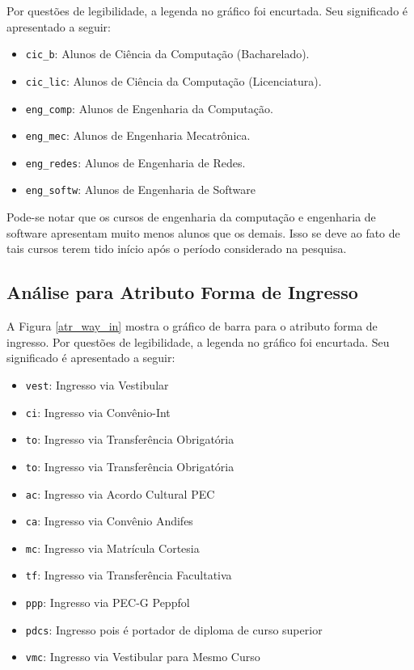 Por questões de legibilidade, a legenda no gráfico foi encurtada. Seu significado é
apresentado a seguir: 
\begin{itemize}
    \item \texttt{cic\_b}: Alunos de Ciência da Computação (Bacharelado).
    \item \texttt{cic\_lic}: Alunos de Ciência da Computação (Licenciatura).
    \item \texttt{eng\_comp}: Alunos de Engenharia da Computação.
    \item \texttt{eng\_mec}: Alunos de Engenharia Mecatrônica.
    \item \texttt{eng\_redes}: Alunos de Engenharia de Redes. 
    \item \texttt{eng\_softw}: Alunos de Engenharia de Software
\end{itemize}

Pode-se notar que os cursos de engenharia da computação e engenharia de software
apresentam muito menos alunos que os demais. Isso se deve ao fato de tais cursos
terem tido início após o período considerado na pesquisa. 
\clearpage


\subsection{Análise para Atributo Forma de Ingresso}
A Figura \ref{atr_way_in} mostra o gráfico de barra para o atributo forma de ingresso. 
Por questões de legibilidade, a legenda no gráfico foi encurtada. Seu significado é
apresentado a seguir: 
\begin{itemize}
    \item \texttt{vest}: Ingresso via Vestibular
    \item \texttt{ci}: Ingresso via Convênio-Int
    \item \texttt{to}: Ingresso via Transferência Obrigatória
    \item \texttt{to}: Ingresso via Transferência Obrigatória
    \item \texttt{ac}: Ingresso via Acordo Cultural PEC
    \item \texttt{ca}: Ingresso via Convênio Andifes
    \item \texttt{mc}: Ingresso via Matrícula Cortesia
    \item \texttt{tf}: Ingresso via Transferência Facultativa
    \item \texttt{ppp}: Ingresso via PEC-G Peppfol
    \item \texttt{pdcs}: Ingresso pois é portador de diploma de curso superior
    \item \texttt{vmc}: Ingresso via Vestibular para Mesmo Curso
\end{itemize}


